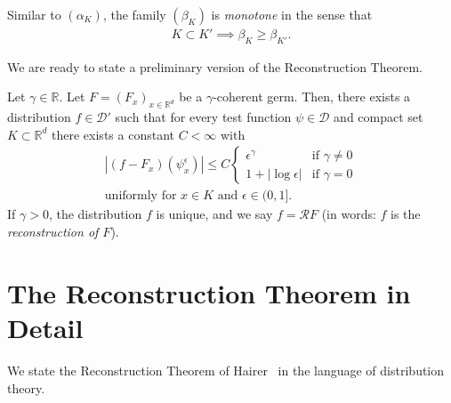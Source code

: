 Similar to \((\alpha_K)\), the family \((\beta_K)\) is \emph{monotone} in the sense that 
\begin{align}\label{beta-monotone}
    K \subset K' \implies \beta_K \geq \beta_{K'}.
\end{align} 


We are ready to state a preliminary version of the Reconstruction Theorem. 

\begin{theorem}\label{peek:prelim-reconstruction-theorem}
    Let \(\gamma \in \mathbb{R}\).
   Let \(F = {(F_x)}_{x \in \mathbb{R}^d}\) be a \(\gamma\)-coherent germ. Then, there exists a distribution \(f \in \mathcal{D}'\) such that for every test function \(\psi \in \mathcal{D}\) and compact set \(K \subset \mathbb{R}^d\) there exists a constant \(C < \infty\) with  
   \begin{gather*}
           |(f-F_x)(\psi^\epsilon_x)| \leq C \begin{cases}
                   \epsilon^\gamma \quad &\text{if \(\gamma \neq 0\)} \\
                   1+|\log\epsilon| & \text{if \(\gamma = 0\)}
           \end{cases} \\ \text{uniformly for \(x \in K\) and \(\epsilon \in (0,1]\)}.
   \end{gather*}
   If \(\gamma > 0\), the distribution \(f\) is unique, and we say \(f = \mathcal{R}F\) (in words: \(f\) is the \emph{reconstruction of \(F\)}).
\end{theorem}






\section{The Reconstruction Theorem in Detail}

We state the Reconstruction Theorem of Hairer~\cite{hairer2014theory} in the language of {distribution theory}.

